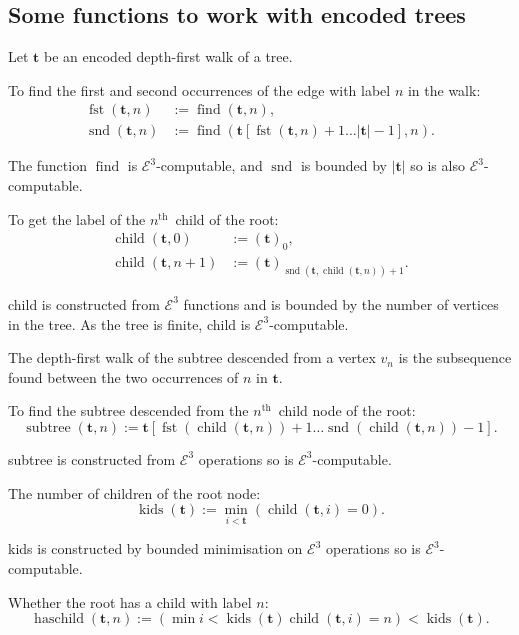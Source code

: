 \documentclass[a4paper]{article}
\newcommand{\grz}[1]{$\mathcal{E}^{#1}$}	%
\newcommand{\nth}{$n^{\textrm{th}}$~}	%
\newcommand{\tvec}{\mathbf{t}}	%
\newcommand{\recur}[1]{\begin{equation} \begin{split} #1 \end{split} \end{equation}}	%
\newcommand{\find}{\operatorname{find}}
\theoremstyle{plain}
\theoremstyle{definition}
\begin{document}
\subsection{Some functions to work with encoded trees}\label{encodetrees}

Let $\tvec$ be an encoded depth-first walk of a tree.

To find the first and second occurrences of the edge with label $n$ in the walk:
\recur{
\operatorname{fst}(\tvec,n) &:= \find(\tvec,n), \\
\operatorname{snd}(\tvec,n) &:= \find\left( \tvec[\operatorname{fst}(\tvec,n)+1 \dots |\tvec|-1],n \right).
}

The function $\operatorname{find}$ is \grz{3}-computable, and $\operatorname{snd}$ is bounded by $|\tvec|$ so is also \grz{3}-computable.

To get the label of the \nth child of the root:
\recur{
\operatorname{child}(\tvec,0) &:= (\tvec)_0, \\
\operatorname{child}(\tvec,n+1) &:= (\tvec)_{\operatorname{snd}(\tvec,\operatorname{child}(\tvec,n))+1}.
}

child is constructed from \grz{3} functions and is bounded by the number of vertices in the tree. As the tree is finite, child is \grz{3}-computable.

The depth-first walk of the subtree descended from a vertex $v_n$ is the subsequence found between the two occurrences of $n$ in $\tvec$. 

To find the subtree descended from the \nth child node of the root:
\begin{equation} \operatorname{subtree}(\tvec,n) := \tvec[\operatorname{fst}(\operatorname{child}(\tvec,n))+1 \dots \operatorname{snd}(\operatorname{child}(\tvec,n))-1]. \end{equation}

subtree is constructed from \grz{3} operations so is \grz{3}-computable.

The number of children of the root node:
\begin{equation} \operatorname{kids}(\tvec) := \min_{i < \tvec} (\operatorname{child}(\tvec,i)=0). \end{equation}

kids is constructed by bounded minimisation on \grz{3} operations so is \grz{3}-computable.

Whether the root has a child with label $n$:
\begin{equation} \operatorname{haschild}(\tvec,n) :=  \left( \min{i < \operatorname{kids}(\tvec)}{\operatorname{child}(\tvec,i)=n} \right) < \operatorname{kids}(\tvec). \end{equation}
\end{document}
